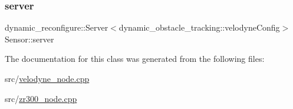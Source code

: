 \mbox{\label{classSensor_a3e4e922879e1a2e7921c685b00a2f0d3}} 
\subsubsection{\texorpdfstring{server}{server}\hspace{0.1cm}{\footnotesize\ttfamily [2/2]}}
{\footnotesize\ttfamily dynamic\+\_\+reconfigure\+::\+Server$<$dynamic\+\_\+obstacle\+\_\+tracking\+::velodyne\+Config$>$ Sensor\+::server\hspace{0.3cm}{\ttfamily [protected]}}



The documentation for this class was generated from the following files\+:\begin{DoxyCompactItemize}
\item 
src/\hyperlink{velodyne__node_8cpp}{velodyne\+\_\+node.\+cpp}\item 
src/\hyperlink{zr300__node_8cpp}{zr300\+\_\+node.\+cpp}\end{DoxyCompactItemize}
